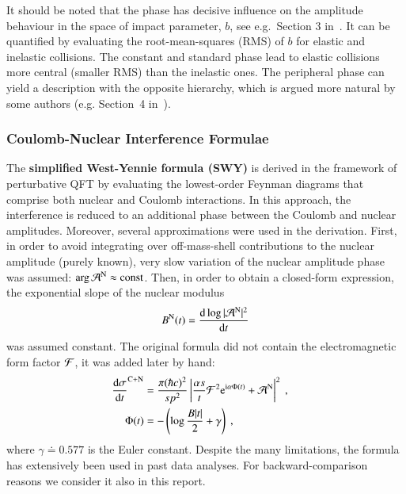 It should be noted that the phase has decisive influence on the amplitude behaviour in the space of impact parameter, $b$, see e.g.~Section 3 in~\cite{klk02}. It can be quantified by evaluating the root-mean-squares (RMS) of $b$ for elastic and inelastic collisions. The constant and standard phase lead to elastic collisions more central (smaller RMS) than the inelastic ones. The peripheral phase can yield a description with the opposite hierarchy, which is argued more natural by some authors (e.g. Section~4 in~\cite{kl96}).

\subsubsection{Coulomb-Nuclear Interference Formulae}

The {\bf simplified West-Yennie formula (SWY)} \cite{wy68} is derived in the framework of perturbative QFT by evaluating the lowest-order Feynman diagrams that comprise both nuclear and Coulomb interactions. In this approach, the interference is reduced to an additional phase between the Coulomb and nuclear amplitudes. Moreover, several approximations were used in the derivation. First, in order to avoid integrating over off-mass-shell contributions to the nuclear amplitude (purely known), very slow variation of the nuclear amplitude phase was assumed: $\arg {\cal A}^{\rm N} \approx \hbox{const}$. Then, in order to obtain a closed-form expression, the exponential slope of the nuclear modulus
\begin{equation}
B^{\rm N}(t) = {\d \log |{\cal A}^{\rm N}|^2 \over \d t}
\end{equation}
was assumed constant. The original formula did not contain the electromagnetic form factor ${\cal F}$, it was added later by hand:
\begin{equation}
\label{eq:int swy}
	\begin{aligned}
		{\d\sigma\over \d t}^{\rm C+N} &= {\pi (\hbar c)^2 \over s p^2} \left | {\alpha s\over t} {\cal F}^2 \e^{\I\alpha \Phi(t)} + {\cal A}^{\rm N} \right |^2\ ,\cr
		\Phi(t) &= - \left( \log {B |t|\over 2} + \gamma \right)\ ,\cr
	\end{aligned}
\end{equation}
where $\gamma \doteq 0.577$ is the Euler constant. Despite the many limitations, the formula has extensively been used in past data analyses. For backward-comparison reasons we consider it also in this report.

